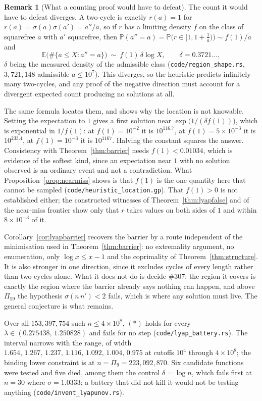 \documentclass[11pt]{article}
\theoremstyle{definition}
\newtheorem{remark}[theorem]{Remark}
\begin{document}
\begin{remark}[What a counting proof would have to defeat]\label{rem:whatcounting}
The count it would have to defeat diverges. A two-cycle is exactly $r(a)=1$ for
$r(a)=\sigma(a)\sigma(a')=a''/a$, so if $r$ has a limiting density $f$ on the class of squarefree $a$
with $a'$ squarefree, then $\mathbb{P}(a''=a)=\mathbb{P}\bigl(r\in[1,1+\tfrac1a)\bigr)\sim f(1)/a$ and
\[ \mathbb{E}\bigl(\#\{a\le X:a''=a\}\bigr)\ \sim\ f(1)\,\delta\log X,\qquad \delta=0.3721\ldots, \]
$\delta$ being the measured density of the admissible class \textup{(\texttt{code/region\_shape.rs},
$3{,}721{,}148$ admissible $a\le10^7$)}. This diverges, so the heuristic predicts infinitely many
two-cycles, and any proof of the negative direction must account for a divergent expected count
producing no solutions at all.

The same formula locates them, and shows why the location is not knowable. Setting the expectation to
$1$ gives a first solution near $\exp\bigl(1/(\delta f(1))\bigr)$, which is exponential in $1/f(1)$:
at $f(1)=10^{-2}$ it is $10^{116.7}$, at $f(1)=5\times10^{-3}$ it is $10^{233.4}$, at $f(1)=10^{-3}$
it is $10^{1167}$. Halving the constant squares the answer. Consistency with
Theorem~\ref{thm:barrier} needs $f(1)<0.01034$, which is evidence of the softest kind, since an
expectation near $1$ with no solution observed is an ordinary event and not a contradiction. What
Proposition~\ref{prop:nearmiss} shows is that $f(1)$ is the one quantity here that cannot be sampled
\textup{(\texttt{code/heuristic\_location.gp})}. That $f(1)>0$ is not established either; the
constructed witnesses of Theorem~\ref{thm:lyapfalse} and of the near-miss frontier show only that $r$
takes values on both sides of $1$ and within $8\times10^{-3}$ of it.
\end{remark}

Corollary~\ref{cor:lyapbarrier} recovers the barrier by a route independent of the minimisation
used in Theorem~\ref{thm:barrier}: no extremality argument, no enumeration, only $\log x\le x-1$ and
the coprimality of Theorem~\ref{thm:structure}. It is also stronger in one direction, since it
excludes cycles of every length rather than two-cycles alone. What it does not do is decide
\#307: the region it covers is exactly the region where the barrier already says nothing can
happen, and above $\Pi_{59}$ the hypothesis $\sigma(n\,n')<2$ fails, which is where any solution
must live. The general conjecture is what remains.

Over all $153{,}397{,}754$ such $n\le4\times10^8$, $(\ast)$ holds for every
$\lambda\in(0.275438,\,1.250828)$ and fails for no step
\textup{(\texttt{code/lyap\_battery.rs})}. The interval narrows with the range, of width
$1.654,\,1.267,\,1.237,\,1.116,\,1.092,\,1.004,\,0.975$ at cutoffs $10^4$ through $4\times10^8$;
the binding lower constraint is at $n=\Pi_9=223{,}092{,}870$. Six
candidate functions were tested and five died, among them the control $\delta=\log n$, which fails
first at $n=30$ where $\sigma=1.0333$; a battery that did not kill it would not be testing anything
\textup{(\texttt{code/invent\_lyapunov.rs})}.
\end{document}

